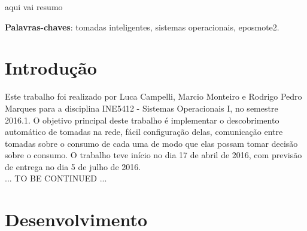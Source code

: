 \documentclass[article,11pt,oneside,a4paper,english,brazil]{abntex2}
\begin{document}
\frenchspacing 


%
%
\maketitle

\begin{resumoumacoluna}
	aqui vai resumo
	
	\vspace{\onelineskip}
	
	\noindent
	\textbf{Palavras-chaves}: tomadas inteligentes, sistemas operacionais, eposmote2.
\end{resumoumacoluna}


\textual

\section{Introdução}

	Este trabalho foi realizado por Luca Campelli, Marcio Monteiro e Rodrigo Pedro Marques para a disciplina INE5412 - Sistemas Operacionais I, no semestre 2016.1. O objetivo principal deste trabalho é implementar o descobrimento automático de tomadas na rede, fácil configuração delas, comunicação entre tomadas sobre o consumo de cada uma de modo que elas possam tomar decisão sobre o consumo. O trabalho teve início no dia 17 de abril de 2016, com previsão de entrega no dia 5 de julho de 2016.\\
	... TO BE CONTINUED ...

\section{Desenvolvimento}
\end{document}
